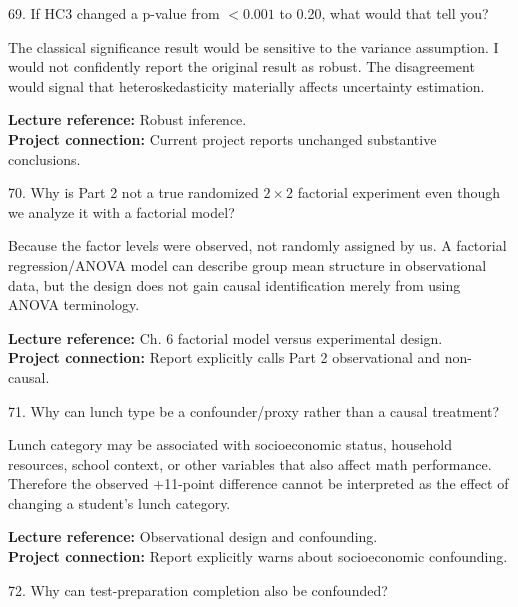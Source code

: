\documentclass[10.5pt,a4paper]{article}
\newcommand{\chapref}[1]{\textbf{Lecture reference:} #1}
\newcommand{\projectref}[1]{\textbf{Project connection:} #1}
\begin{document}
\begin{qbox}{69. If HC3 changed a p-value from $<0.001$ to 0.20, what would that tell you?}
\end{qbox}
\begin{answerbox}The classical significance result would be sensitive to the variance assumption. I would not confidently report the original result as robust. The disagreement would signal that heteroskedasticity materially affects uncertainty estimation.\end{answerbox}
\begin{refbox}\chapref{Robust inference.}\\\projectref{Current project reports unchanged substantive conclusions.}\end{refbox}
\begin{qbox}{70. Why is Part 2 not a true randomized $2\times2$ factorial experiment even though we analyze it with a factorial model?}
\end{qbox}
\begin{answerbox}Because the factor levels were observed, not randomly assigned by us. A factorial regression/ANOVA model can describe group mean structure in observational data, but the design does not gain causal identification merely from using ANOVA terminology.\end{answerbox}
\begin{refbox}\chapref{Ch. 6 factorial model versus experimental design.}\\\projectref{Report explicitly calls Part 2 observational and non-causal.}\end{refbox}
\begin{qbox}{71. Why can lunch type be a confounder/proxy rather than a causal treatment?}
\end{qbox}
\begin{answerbox}Lunch category may be associated with socioeconomic status, household resources, school context, or other variables that also affect math performance. Therefore the observed +11-point difference cannot be interpreted as the effect of changing a student's lunch category.\end{answerbox}
\begin{refbox}\chapref{Observational design and confounding.}\\\projectref{Report explicitly warns about socioeconomic confounding.}\end{refbox}
\begin{qbox}{72. Why can test-preparation completion also be confounded?}
\end{qbox}
\end{document}
